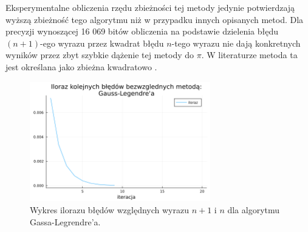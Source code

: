 Eksperymentalne obliczenia rzędu zbieżności tej metody jedynie potwierdzają wyższą zbieżność tego algorytmu niż w przypadku innych opisanych metod. Dla precyzji wynoszącej 16 069 bitów obliczenia na podstawie dzielenia błędu $(n+1)$-ego wyrazu przez kwadrat błędu $n$-tego wyrazu nie dają konkretnych wyników przez zbyt szybkie dążenie tej metody do $\pi$. W literaturze metoda ta jest określana jako zbieżna kwadratowo \cite{gausse-smth}.

\begin{figure}[!h]
    \centering
    \renewcommand{\figurename}{Wykres}
    \includegraphics[width=0.7\textwidth]{../prog/gauss_legendre_error_ratio.png}
    \caption{Wykres ilorazu błędów względnych wyrazu $n+1$ i $n$ dla algorytmu Gassa-Legrendre'a.}
    \label{gauss-convergence}
\end{figure}